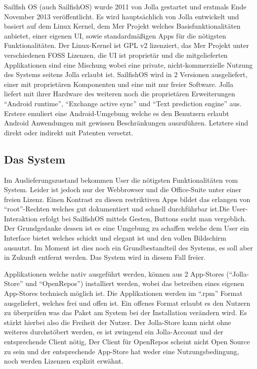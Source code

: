 Sailfish OS (auch \mbox{SailfishOS}) wurde 2011 von Jolla gestartet und erstmals Ende November 2013\cite{online:jolla-about} veröffentlicht. Es wird hauptsächlich von Jolla entwickelt und basiert auf dem Linux Kernel, dem Mer Projekt welches Basisfunktionalitäten anbietet, einer eigenen UI, sowie standardmäßigen Apps für die nötigsten Funktionalitäten\cite{online:sailfish-about}. Der Linux-Kernel ist GPL v2 lizenziert\cite{online:kernel-license}, das Mer Projekt unter verschiedenen FOSS Lizenzen\cite{online:mer-license}, die UI ist proprietär und die mitgelieferten Applikationen sind eine Mischung\cite{online:sailfish-about} wobei eine private, nicht-kommerzielle Nutzung des Systems seitens Jolla erlaubt ist\cite{online:sailfish-eula}. \mbox{SailfishOS} wird in 2 Versionen ausgeliefert, einer mit proprietären Komponenten und eine mit nur freier Software. Jolla liefert mit ihrer Hardware des weiteren noch die proprietären Erweiterungen\cite{online:sailfish-about} ``Android runtime''\cite{online:sailfish-android-runtime-licensor}, ``Exchange active sync''\cite{online:microsoft-eas} und ``Text prediction engine''\cite{online:jolla-xt9}\cite{online:xt9-license} aus. Erstere emuliert eine Android-Umgebung welche es den Benutzern erlaubt Android Anwendungen mit gewissen Beschränkungen auszuführen\cite{online:sailfish-android-runtime}. Letztere sind direkt oder indirekt mit Patenten versetzt.\\

\subsection{Das System}
Im Auslieferungszustand bekommen User die nötigsten Funktionalitäten vom System. Leider ist jedoch nur der Webbrowser und die Office-Suite unter einer freien Lizenz\cite{online:sailfish-about}. Einen Kontrast zu diesen restriktiven Apps bildet das erlangen von ``root''-Rechten welches gut dokumentiert und schnell durchführbar ist\cite{online:sailfish-root}.Die User-Interaktion erfolgt bei SailfishOS mittels Gesten, Buttons sucht man vergeblich. Der Grundgedanke dessen ist es eine Umgebung zu schaffen welche dem User ein Interface bietet welches schickt und elegant ist und den vollen Bildschirm ausnutzt\cite{online:sailfish-ui}. Im Moment ist dies noch ein Grundbestandteil des Systems, es soll aber in Zukunft entfernt werden\cite{online:sailfish-about}. Das System wird in diesem Fall freier. 

Applikationen welche nativ ausgeführt werden, können aus 2 App-Stores (``Jolla-Store'' und ``OpenRepos''\cite{online:openrepos}) installiert werden, wobei das betreiben eines eigenen App-Stores technisch möglich ist. Die Applikationen werden im ``\mbox{.rpm}'' Format ausgeliefert, welches frei und offen\cite{online:rpm-license} ist. Ein offenes Format erlaubt es den Nutzern zu überprüfen was das Paket am System bei der Installation verändern wird. Es stärkt hierbei also die Freiheit der Nutzer. Der Jolla-Store kann nicht ohne weiteres durchstöbert werden, es ist zwingend ein Jolla-Account und der entsprechende Client nötig\cite{online:jolla-store}, Der Client für OpenRepos scheint nicht Open Source zu sein und der entsprechende App-Store hat weder eine Nutzungsbedingung, noch werden Lizenzen explizit erwähnt.

